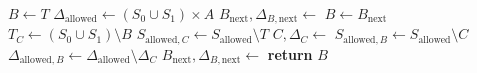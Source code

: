 \begin{algorithm}[t!]
    \caption{Computation of Weak Attractors}\label{alg:watr}
    \begin{algorithmic}[1]
            \State $B\gets T$
            \State $\Delta_\text{allowed}\gets (S_0\cup S_1)\times A$
            \State $B_\text{next}, \Delta_{B, \text{next}}\gets $ 
                \State $B\gets B_\text{next}$
                \State $T_C\gets(S_0\cup S_1)\setminus B$
                \State $S_{\text{allowed}, C}\gets S_\text{allowed}\setminus T$
                \State $C, \Delta_C\gets$ 
                \State $S_{\text{allowed}, B}\gets S_\text{allowed}\setminus C$
                \State $\Delta_{\text{allowed}, B}\gets \Delta_\text{allowed}\setminus \Delta_C$
                \State $B_\text{next}, \Delta_{B, \text{next}}\gets $ 
            \EndWhile
        \EndProcedure
        \State \textbf{return} $B$
    \end{algorithmic}
\end{algorithm}